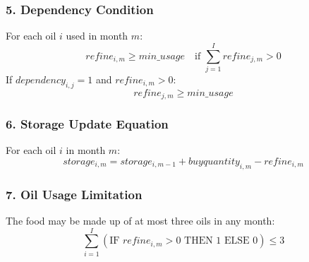 \documentclass{article}
\begin{document}
\subsubsection*{5. Dependency Condition}
For each oil \( i \) used in month \( m \):
\[
refine_{i,m} \geq min\_usage \quad \text{if } \sum_{j=1}^{I} refine_{j,m} > 0
\]
If \( dependency_{i,j} = 1 \) and \( refine_{i,m} > 0 \):
\[
refine_{j,m} \geq min\_usage
\]

\subsubsection*{6. Storage Update Equation}
For each oil \( i \) in month \( m \):
\[
storage_{i,m} = storage_{i,m-1} + buyquantity_{i,m} - refine_{i,m}
\]

\subsubsection*{7. Oil Usage Limitation}
The food may be made up of at most three oils in any month:
\[
\sum_{i=1}^{I} \left( \text{IF } refine_{i,m} > 0 \text{ THEN } 1 \text{ ELSE } 0 \right) \leq 3
\]
\end{document}
